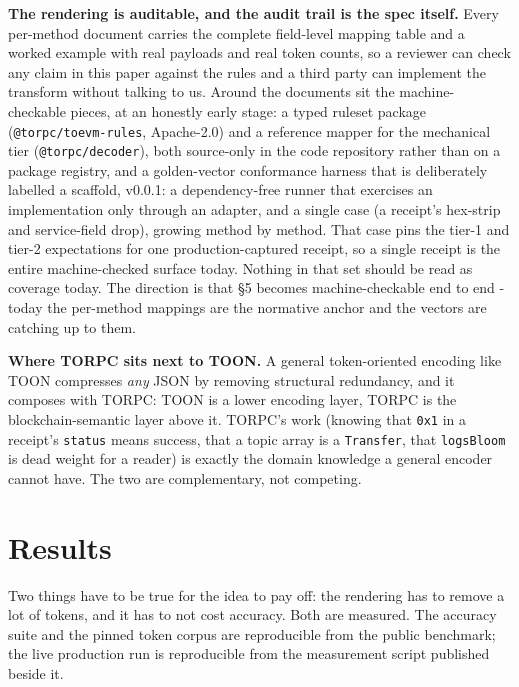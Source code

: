 \documentclass[11pt]{article}
\newcommand{\code}[1]{\texttt{#1}}
\begin{document}
\textbf{The rendering is auditable, and the audit trail is the spec itself.} Every per-method document carries the complete field-level mapping table and a worked example with real payloads and real token counts, so a reviewer can check any claim in this paper against the rules and a third party can implement the transform without talking to us. Around the documents sit the machine-checkable pieces, at an honestly early stage: a typed ruleset package (\code{@torpc/toevm-rules}, Apache-2.0) and a reference mapper for the mechanical tier (\code{@torpc/decoder}), both source-only in the code repository rather than on a package registry, and a golden-vector conformance harness that is deliberately labelled a scaffold, v0.0.1: a dependency-free runner that exercises an implementation only through an adapter, and a single case (a receipt's hex-strip and service-field drop), growing method by method. That case pins the tier-1 and tier-2 expectations for one production-captured receipt, so a single receipt is the entire machine-checked surface today. Nothing in that set should be read as coverage today. The direction is that \S5 becomes machine-checkable end to end - today the per-method mappings are the normative anchor and the vectors are catching up to them.

\textbf{Where TORPC sits next to TOON.} A general token-oriented encoding like TOON \cite{toon} compresses \emph{any} JSON by removing structural redundancy, and it composes with TORPC: TOON is a lower encoding layer, TORPC is the blockchain-semantic layer above it. TORPC's work (knowing that \code{0x1} in a receipt's \code{status} means success, that a topic array is a \code{Transfer}, that \code{logsBloom} is dead weight for a reader) is exactly the domain knowledge a general encoder cannot have. The two are complementary, not competing.

\section{Results}

Two things have to be true for the idea to pay off: the rendering has to remove a lot of tokens, and it has to not cost accuracy. Both are measured. The accuracy suite and the pinned token corpus are reproducible from the public benchmark; the live production run is reproducible from the measurement script published beside it.
\end{document}

